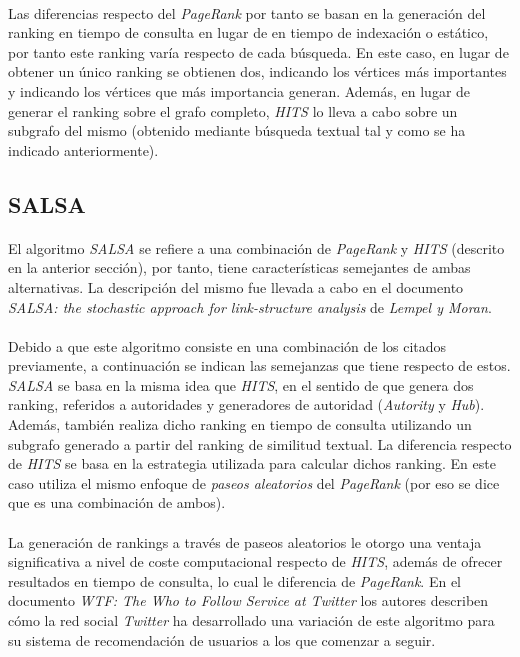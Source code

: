 \documentclass{subfiles}
\begin{document}
        \paragraph{}
        Las diferencias respecto del \emph{PageRank} por tanto se basan en la generación del ranking en tiempo de consulta en lugar de en tiempo de indexación o estático, por tanto este ranking varía respecto de cada búsqueda. En este caso, en lugar de obtener un único ranking se obtienen dos, indicando los vértices más importantes y indicando los vértices que más importancia generan. Además, en lugar de generar el ranking sobre el grafo completo, \emph{HITS} lo lleva a cabo sobre un subgrafo del mismo (obtenido mediante búsqueda textual tal y como se ha indicado anteriormente).

      \subsection{SALSA}
      \label{sec:salsa}

        \paragraph{}
        El algoritmo \emph{SALSA} se refiere a una combinación de \emph{PageRank} y \emph{HITS} (descrito en la anterior sección), por tanto, tiene características semejantes de ambas alternativas. La descripción del mismo fue llevada a cabo en el documento \emph{SALSA: the stochastic approach for link-structure analysis}\cite{lempel2001salsa} de \emph{Lempel y Moran}.

        \paragraph{}
        Debido a que este algoritmo consiste en una combinación de los citados previamente, a continuación se indican las semejanzas que tiene respecto de estos. \emph{SALSA} se basa en la misma idea que \emph{HITS}, en el sentido de que genera dos ranking, referidos a autoridades y generadores de autoridad (\emph{Autority} y \emph{Hub}). Además, también realiza dicho ranking en tiempo de consulta utilizando un subgrafo generado a partir del ranking de similitud textual. La diferencia respecto de \emph{HITS} se basa en la estrategia utilizada para calcular dichos ranking. En este caso utiliza el mismo enfoque de \emph{paseos aleatorios} del \emph{PageRank} (por eso se dice que es una combinación de ambos).

        \paragraph{}
        La generación de rankings a través de paseos aleatorios le otorgo una ventaja significativa a nivel de coste computacional respecto de \emph{HITS}, además de ofrecer resultados en tiempo de consulta, lo cual le diferencia de \emph{PageRank}. En el documento \emph{WTF: The Who to Follow Service at Twitter} \cite{gupta2013wtf} los autores describen cómo la red social \emph{Twitter} ha desarrollado una variación de este algoritmo para su sistema de recomendación de usuarios a los que comenzar a seguir.
\end{document}
